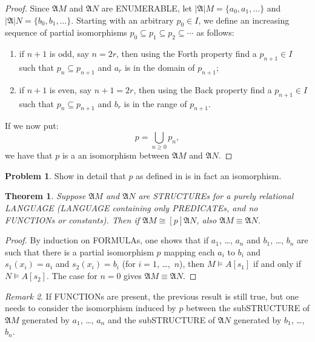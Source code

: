 \documentclass[10pt,a4paper]{article}
\makeatletter
\newcommand*{\olup}[1]{\MakeUppercase{#1}}
\theoremstyle{plain}
\newtheorem{thm}{Theorem}[section]
\theoremstyle{definition}
\newtheorem{prob}{Problem}[section]
\theoremstyle{remark}
\newtheorem{rem}[thm]{Remark}
\newcommand*{\ollabel}[1]{\label{#1}}
\newcommand{\olref}{\@ifnextchar[{\olref@i}{\olref@final}}
\def\olref@i[#1]{\@ifnextchar[{\olref@ii}{\olref@final}}
\def\olref@ii[#1]{\@ifnextchar[{\olref@iii}{\olref@final}}
\def\olref@iii[#1]{\olref@final}
\def\olref@final#1{\ref{#1}}
\providecommand{\Struct}{\ensuremath{\mathfrak{A}}}
\providecommand{\Domain}{\ensuremath{|\mathfrak{A}|}}
\providecommand{\Sat}[2]{\ensuremath{#1 \models #2}}
\providecommand{\iso}{\cong}
\providecommand{\elemequiv}{\mathrel{\equiv}}
\makeatother
\begin{document}
\begin{proof}
  Since $\Struct{M}$ and $\Struct{N}$ are \olup{enumerable}, let $\Domain{M} =
  \{a_0, a_1, \ldots \}$ and $\Domain{N} = \{b_0, b_1, \ldots \}$. Starting
  with an arbitrary $p_0 \in I$, we define an increasing
  sequence of partial isomorphisms $p_0 \subseteq p_1 \subseteq p_2
  \subseteq \cdots$ as follows:
  \begin{enumerate}
  \item if $n+1$ is odd, say $n = 2r$, then using the Forth property
    find a $p_{n+1} \in I$ such that $p_n \subseteq p_{n+1}$
    and $a_r$ is in the domain of $p_{n+1}$;
  \item if $n+1$ is even, say $n+1 =2r$, then using the Back property
    find a $p_{n+1} \in I$ such that $p_n \subseteq p_{n+1}$
    and $b_r$ is in the range of $p_{n+1}$.
  \end{enumerate}
If we now put:
\[
p = \bigcup_{n\ge 0} p_n,
\]
we have that $p$ is a an isomorphism between $\Struct{M}$ and
$\Struct{N}$.
\end{proof}

\begin{prob}
  Show in detail that $p$ as defined in
  \olref[mod][bas][pis]{thm:p-isom1} is in fact an isomorphism.
\end{prob}

\begin{thm}\ollabel{thm:p-isom2}
  Suppose $\Struct{M}$ and $\Struct{N}$ are \olup{structure}s for a
  purely relational \olup{language} (\olup{language} containing only
  \olup{predicate}s, and no \olup{function}s or constants). Then if
  $\Struct{M} \iso[p] \Struct{N}$, also $\Struct{M} \elemequiv
  \Struct{N}$.
\end{thm}

\begin{proof}
  By induction on \olup{formula}s, one shows that if $a_1$, \dots, $a_n$ and
  $b_1$, \dots, $b_n$ are such that there is a partial isomorphism $p$
  mapping each $a_i$ to $b_i$ and $s_1(x_i) =a_i$ and $s_2(x_i) =b_i$
  (for $i =1$, \dots,~$n$), then $\Sat{M}{A}[s_1]$ if
  and only if $\Sat{N}{A}[s_2]$. The case for $n=0$
  gives $\Struct{M} \elemequiv \Struct{N}$.
\end{proof}

\begin{rem}
If \olup{function}s are present, the previous result is still true, but
one needs to consider the isomorphism induced by $p$ between the
sub\olup{structure} of $\Struct{M}$ generated by $a_1$, \dots, $a_n$ and the
sub\olup{structure} of $\Struct{N}$ generated by $b_1$, \dots, $b_n$.
\end{rem}
\end{document}
